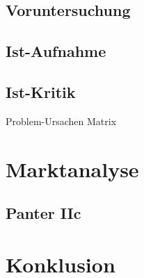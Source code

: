 \subsection{Voruntersuchung}


\subsection{Ist-Aufnahme}


\subsection{Ist-Kritik}
Problem-Ursachen Matrix

\section{Marktanalyse}
\subsection{Panter IIc}

\section{Konklusion}
